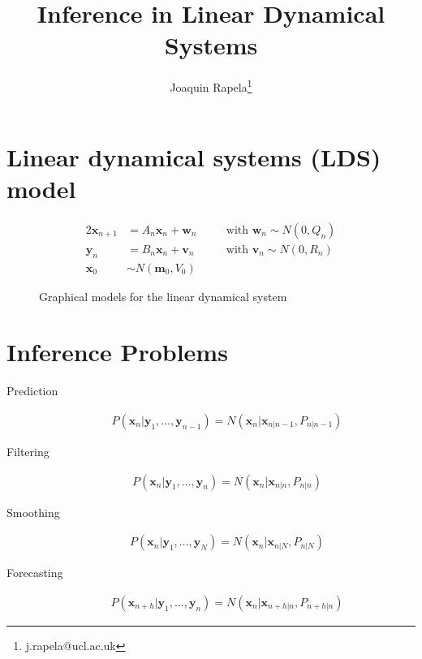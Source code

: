 \documentclass[12pt]{article}
\title{Inference in Linear Dynamical Systems}
\author{Joaquin Rapela\thanks{j.rapela@ucl.ac.uk}}
\begin{document}
\maketitle

\section{Linear dynamical systems (LDS) model}
\label{sec:ldsModel}

\begin{alignat*}{2}
    \mathbf{x}_{n+1}&=A_n\mathbf{x}_n+\mathbf{w}_n&\quad&\text{with }\mathbf{w}_n\sim N(0,Q_n)\\
    \mathbf{y}_n&=B_n\mathbf{x}_n+\mathbf{v}_n&&\text{with }\mathbf{v}_n\sim N(0,R_n)\\
    \mathbf{x}_0&\sim N(\mathbf{m}_0,V_0)&&
\end{alignat*}

\begin{figure}[h]
\begin{center}
    
    \label{fig:ldsGraphicalModel}
    \caption{Graphical models for the linear dynamical system}
\end{center}
\end{figure}

\section{Inference Problems}
\label{sec:inferenceProblems}

\begin{description}
    \item[Prediction]
        \begin{align}
            P(\mathbf{x}_n|\mathbf{y}_1,\ldots,\mathbf{y}_{n-1})=N(\mathbf{x}_n|\mathbf{x}_{n|n-1},P_{n|n-1})\label{eq:prediction}
        \end{align}
    \item[Filtering]
        \begin{align}
            P(\mathbf{x}_n|\mathbf{y}_1,\ldots,\mathbf{y}_{n})=N(\mathbf{x}_n|\mathbf{x}_{n|n},P_{n|n})\label{eq:filtering}
        \end{align}
    \item[Smoothing]
        \begin{align}
            P(\mathbf{x}_n|\mathbf{y}_1,\ldots,\mathbf{y}_{N})=N(\mathbf{x}_n|\mathbf{x}_{n|N},P_{n|N})\label{eq:smoothing}
        \end{align}
    \item[Forecasting]
        \begin{align}
            P(\mathbf{x}_{n+h}|\mathbf{y}_1,\ldots,\mathbf{y}_{n})=N(\mathbf{x}_n|\mathbf{x}_{n+h|n},P_{n+h|n})\label{eq:forecasting}
        \end{align}
\end{description}
\end{document}
